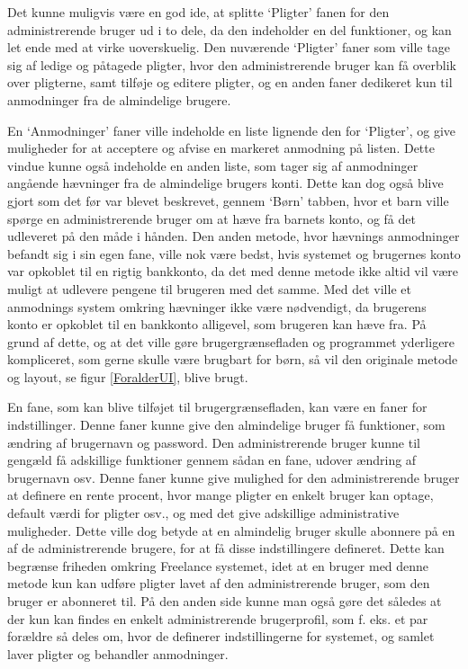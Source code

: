 Det kunne muligvis være en god ide, at splitte ‘Pligter’ fanen for den administrerende bruger ud i to dele, da den indeholder en del funktioner, og kan let ende med at virke uoverskuelig. Den nuværende ‘Pligter’ faner som ville tage sig af ledige og påtagede pligter, hvor den administrerende bruger kan få overblik over pligterne, samt tilføje og editere pligter, og en anden faner dedikeret kun til anmodninger fra de almindelige brugere.

En ‘Anmodninger’ faner ville indeholde en liste lignende den for ‘Pligter’, og give muligheder for at acceptere og afvise en markeret anmodning på listen. Dette vindue kunne også indeholde en anden liste, som tager sig af anmodninger angående hævninger fra de almindelige brugers konti. Dette kan dog også blive gjort som det før var blevet beskrevet, gennem ‘Børn’ tabben, hvor et barn ville spørge en administrerende bruger om at hæve fra barnets konto, og få det udleveret på den måde i hånden. Den anden metode, hvor hævnings anmodninger befandt sig i sin egen fane, ville nok være bedst, hvis systemet og brugernes konto var opkoblet til en rigtig bankkonto, da det med denne metode ikke altid vil være muligt at udlevere pengene til brugeren med det samme. Med det ville et anmodnings system omkring hævninger ikke være nødvendigt, da brugerens konto er opkoblet til en bankkonto alligevel, som brugeren kan hæve fra. På grund af dette, og at det ville gøre brugergrænsefladen og programmet yderligere kompliceret, som gerne skulle være brugbart for børn, så vil den originale metode og layout, se figur \ref{ForalderUI}, blive brugt.

En fane, som kan blive tilføjet til brugergrænsefladen, kan være en faner for indstillinger. Denne faner kunne give den almindelige bruger få funktioner, som ændring af brugernavn og password. Den administrerende bruger kunne til gengæld få adskillige funktioner gennem sådan en fane, udover ændring af brugernavn osv. Denne faner kunne give mulighed for den administrerende bruger at definere en rente procent, hvor mange pligter en enkelt bruger kan optage, default værdi for pligter osv., og med det give adskillige administrative muligheder. Dette ville dog betyde at en almindelig bruger skulle abonnere på en af de administrerende brugere, for at få disse indstillingere defineret. Dette kan begrænse friheden omkring Freelance systemet, idet at en bruger med denne metode kun kan udføre pligter lavet af den administrerende bruger, som den bruger er abonneret til. På den anden side kunne man også gøre det således at der kun kan findes en enkelt administrerende brugerprofil, som f. eks. et par forældre så deles om, hvor de definerer indstillingerne for systemet, og samlet laver pligter og behandler anmodninger.